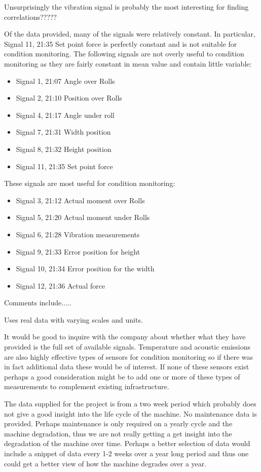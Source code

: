 \documentclass[]{article}
\begin{document}
Unsurprisingly the vibration signal is probably the most interesting for finding correlations?????

Of the data provided, many of the signals were relatively constant. In particular, Signal 11, 21:35 Set point force is perfectly constant and is not suitable for condition monitoring. The following signals are not overly useful to condition monitoring as they are fairly constant in mean value and contain little variable: 
\begin{itemize}
\item Signal 1, 21:07 Angle over Rolls
\item Signal 2, 21:10 Position over Rolls
\item Signal 4, 21:17 Angle under roll
\item Signal 7, 21:31 Width position
\item Signal 8, 21:32 Height position
\item Signal 11, 21:35 Set point force
\end{itemize}

These signals are most useful for condition monitoring:
\begin{itemize}
\item Signal 3, 21:12 Actual moment over Rolls
\item Signal 5, 21:20 Actual moment under Rolls
\item Signal 6, 21:28 Vibration measurements 
\item Signal 9, 21:33 Error position for height
\item Signal 10, 21:34 Error position for the width
\item Signal 12, 21:36 Actual force           
\end{itemize}



Comments include.....

Uses real data with varying scales and units.

It would be good to inquire with the company about whether what they have provided is the full set of available signals. Temperature and acoustic emissions are also highly effective types of sensors for condition monitoring so if there was in fact additional data these would be of interest. If none of these sensors exist perhaps a good consideration might be to add one or more of these types of measurements to complement existing infrastructure.

The data supplied for the project is from a two week period which probably does not give a good insight into the life cycle of the machine. No maintenance data is provided. Perhaps maintenance is only required on a yearly cycle and the machine degradation, thus we are not really getting a get insight into the degradation of the machine over time. Perhaps a better selection of data would include a snippet of data every 1-2 weeks over a year long period and thus one could get a better view of how the machine degrades over a year.
\end{document}
